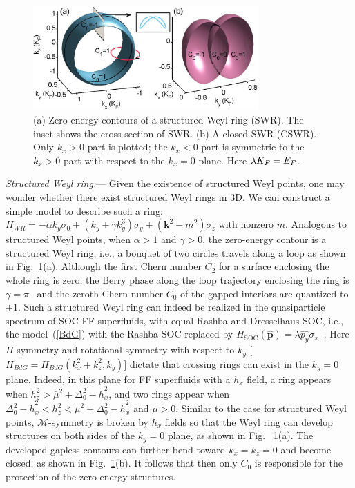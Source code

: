 \documentclass[prl,aps,twocolumn,showpacs,floatfix]{revtex4}
\begin{document}
\begin{figure}[t]
\includegraphics[width=3.4in]{Fig3.eps}
\caption{(a) Zero-energy contours of a structured Weyl ring (SWR). The inset
shows the cross section of SWR. (b) A closed SWR (CSWR). Only $k_x>0$ part
is plotted; the $k_x<0$ part is symmetric to the $k_x>0$ part with respect
to the $k_x=0$ plane. Here $\protect\lambda K_{F}=E_{F}$. }
\label{SWeylRing}
\end{figure}

\emph{Structured Weyl ring.}--- Given the existence of structured Weyl
points, one may wonder whether there exist structured Weyl rings in 3D. We
can construct a simple model to describe such a ring: $H_{WR}=-\alpha
k_{y}\sigma _{0}+(k_{y}+\gamma k_{y}^{3})\sigma _{y}+(\mathbf{k}%
^{2}-m^{2})\sigma _{z}$ with nonzero $m$. Analogous to structured Weyl
points, when $\alpha >1$ and $\gamma >0$, the zero-energy contour is a
structured Weyl ring, i.e., a bouquet of two circles travels along a loop as
shown in Fig.~\ref{SWeylRing}(a). Although the first Chern number $C_{2}$
for a surface enclosing the whole ring is zero, the Berry phase along the
loop trajectory enclosing the ring is $\gamma =\pi $~\cite{Qi2008PRB} and
the zeroth Chern number $C_{0}$ of the gapped interiors are quantized to $%
\pm 1$. Such a structured Weyl ring can indeed be realized in the
quasiparticle spectrum of SOC FF superfluids, with equal Rashba and
Dresselhaus SOC, i.e., the model~(\ref{BdG}) with the Rashba SOC replaced by
$H_{\text{SOC}}(\hat{\mathbf{p}})=\lambda \hat{p_{y}}\sigma _{x}$~\cite%
{Melo2011PRL}. Here $\Pi $ symmetry and rotational symmetry with respect to $%
k_{y}$ [$H_{BdG}=H_{BdG}(k_{x}^{2}+k_{z}^{2},k_{y})$] dictate that crossing
rings can exist in the $k_{y}=0$ plane. Indeed, in this plane for FF
superfluids with a $h_{x}$ field, a ring appears when $h_{z}^{2}>\bar{\mu}%
^{2}+\Delta _{0}^{2}-\bar{h}_{x}^{2}$, and two rings appear when $\Delta
_{0}^{2}-\bar{h}_{x}^{2}<h_{z}^{2}<\bar{\mu}^{2}+\Delta _{0}^{2}-\bar{h}%
_{x}^{2}$ and $\bar{\mu}>0$. Similar to the case for structured Weyl points,
$\mathcal{M}$-symmetry is broken by $h_{x}$ fields so that the Weyl ring can
develop structures on both sides of the $k_{y}=0$ plane, as shown in Fig.~%
\ref{SWeylRing}(a). The developed gapless contours can further bend toward $%
k_{x}=k_{z}=0$ and become closed, as shown in Fig.~\ref{SWeylRing}(b). It
follows that then only $C_{0}$ is responsible for the protection of the
zero-energy structures.
\end{document}
